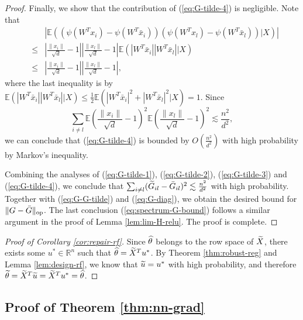 \begin{proof}
Finally, we show that the contribution of (\ref{eq:G-tilde-4}) is negligible. Note that
\begin{eqnarray*}
&& \left|\mathbb{E}\left((\psi(W^Tx_i)-\psi(W^T\bar{x}_i))(\psi(W^Tx_l)-\psi(W^T\bar{x}_l))|X\right)\right| \\
&\leq& \left|\frac{\|x_i\|}{\sqrt{d}}-1\right|\left|\frac{\|x_l\|}{\sqrt{d}}-1\right|\mathbb{E}\left(|W^T\bar{x}_i||W^T\bar{x}_l||X\right) \\
&\leq& \left|\frac{\|x_i\|}{\sqrt{d}}-1\right|\left|\frac{\|x_l\|}{\sqrt{d}}-1\right|,
\end{eqnarray*}
where the last inequality is by $\mathbb{E}\left(|W^T\bar{x}_i||W^T\bar{x}_l||X\right)\leq \frac{1}{2}\mathbb{E}(|W^T\bar{x}_i|^2+|W^T\bar{x}_l|^2|X)=1$.
Since
$$\sum_{i\neq l}\mathbb{E}\left(\frac{\|x_i\|}{\sqrt{d}}-1\right)^2\mathbb{E}\left(\frac{\|x_l\|}{\sqrt{d}}-1\right)^2\lesssim \frac{n^2}{d^2},$$
we can conclude that (\ref{eq:G-tilde-4}) is bounded by $O\left(\frac{n^2}{d^2}\right)$ with high probability by Markov's inequality.

Combining the analyses of (\ref{eq:G-tilde-1}), (\ref{eq:G-tilde-2}), (\ref{eq:G-tilde-3}) and (\ref{eq:G-tilde-4}), we conclude that $\sum_{i\neq l}(\widetilde{G}_{il}-\bar{G}_{il})^2\lesssim \frac{n^2}{d^2}$ with high probability. Together with (\ref{eq:G-G-tilde}) and (\ref{eq:G-diag}), we obtain the desired bound for $\|G-\bar{G}\|_{\rm op}$.
The last conclusion (\ref{eq:spectrum-G-bound}) follows a similar argument in the proof of Lemma \ref{lem:lim-H-relu}. The proof is complete.
\end{proof}



\begin{proof}[Proof of Corollary \ref{cor:repair-rf}]
Since $\widehat{\theta}$ belongs to the row space of $\widetilde{X}$, there exists some $u^*\in\mathbb{R}^n$ such that $\widehat{\theta}=\widetilde{X}^Tu^*$.
By Theorem \ref{thm:robust-reg} and Lemma \ref{lem:design-rf}, we know that $\widetilde{u}=u^*$ with high probability, and therefore $\widetilde{\theta}=\widetilde{X}^T\widetilde{u}=\widetilde{X}^Tu^*=\widehat{\theta}$.
\end{proof}


\subsection{Proof of Theorem \ref{thm:nn-grad}}


